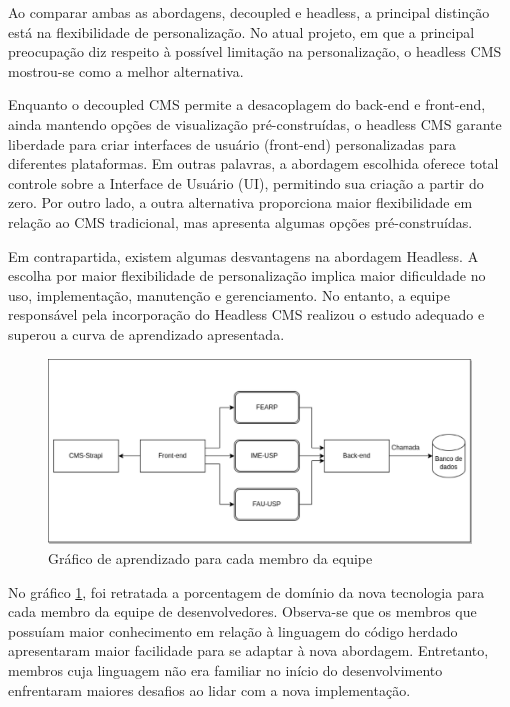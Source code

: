 Ao comparar ambas as abordagens, decoupled e headless, a principal distinção está na flexibilidade de personalização. No atual projeto, em que a principal preocupação diz respeito à possível limitação na personalização, o headless CMS mostrou-se como a melhor alternativa.

Enquanto o decoupled CMS permite a desacoplagem do back-end e front-end, ainda mantendo opções de visualização pré-construídas, o headless CMS garante liberdade para criar interfaces de usuário (front-end) personalizadas para diferentes plataformas. Em outras palavras, a abordagem escolhida oferece total controle sobre a Interface de Usuário (UI), permitindo sua criação a partir do zero. Por outro lado, a outra alternativa proporciona maior flexibilidade em relação ao CMS tradicional, mas apresenta algumas opções pré-construídas.

Em contrapartida, existem algumas desvantagens na abordagem Headless. A escolha por maior flexibilidade de personalização implica maior dificuldade no uso, implementação, manutenção e gerenciamento. No entanto, a equipe responsável pela incorporação do Headless CMS realizou o estudo adequado e superou a curva de aprendizado apresentada.


    \begin{figure}
        \centering
        \includegraphics[width=0.75\linewidth]{figuras/nova_arquitetura.drawio-_1_.pdf}
        \caption{Gráfico de aprendizado para cada membro da equipe}
        \label{fig:learning-curve}
    \end{figure}

No gráfico \ref{fig:learning-curve}, foi retratada a porcentagem de domínio da nova tecnologia para cada membro da equipe de desenvolvedores. Observa-se que os membros que possuíam maior conhecimento em relação à linguagem do código herdado apresentaram maior facilidade para se adaptar à nova abordagem. Entretanto, membros cuja linguagem não era familiar no início do desenvolvimento enfrentaram maiores desafios ao lidar com a nova implementação.

